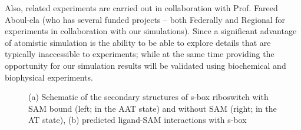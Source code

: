 \documentclass[a4paper,10pt]{article}
\begin{document}
Also, related experiments are carried out in collaboration with Prof. Fareed Aboul-ela (who has several funded projects -- both Federally and Regional for experiments in collaboration with our simulations). Since a significant advantage of atomistic simulation is the ability to be able to explore details that are typically inaccessible to experiments; while at the same time providing the opportunity for our simulation results will be validated using biochemical and biophysical experiments.

\begin{figure}
   \hspace{0.05in}
\caption{(a) Schematic of the secondary structures of s-box riboswitch with SAM bound (left; in the AAT state) and without SAM 
(right; in the AT state), (b) predicted ligand-SAM interactions with s-box}
\end{figure}
\end{document}
